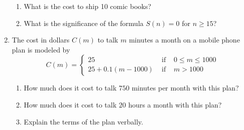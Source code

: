 \documentclass{ximera}
\begin{document}
\begin{enumerate}
\begin{enumerate}
\item  What is the cost to ship 10 comic books?

\item  What is the significance of the formula $S(n) = 0$ for $n \geq 15$?

\end{enumerate}

\newpage

\item  \label{piecewisemobile} The cost in dollars $C(m)$  to talk $m$ minutes a month on a mobile phone plan is modeled by   \[{\displaystyle C(m) = \left\{ \begin{array}{rcl} 25 & \mbox{ if } & 0 \leq m \leq 1000 \\
                                                            25+0.1(m-1000) & \mbox{ if } & m > 1000
                                     \end{array} \right. }\]

\begin{enumerate}

\item  How much does it cost to talk $750$ minutes per month with this plan?

\item  How much does it cost to talk $20$ hours a month with this plan?

\item  Explain the terms of the plan verbally.
\end{enumerate}


\setcounter{HW}{\value{enumi}}
\end{enumerate}
\end{document}
